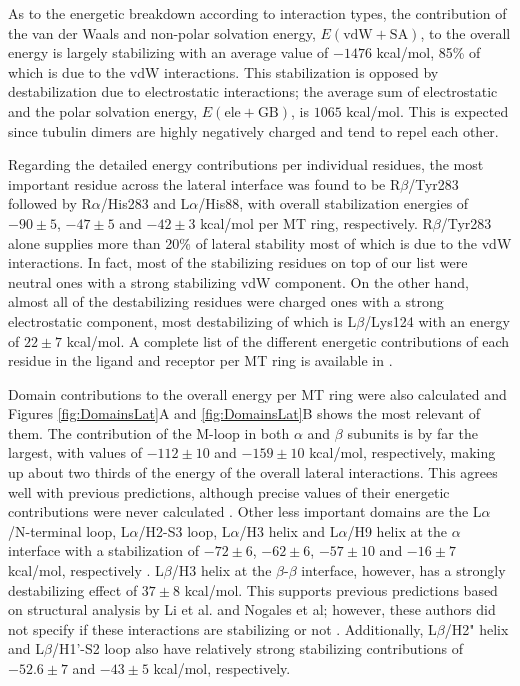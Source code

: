 \documentclass[11pt]{report}
\begin{document}
As to the energetic breakdown according to interaction types, the contribution of the van 
der Waals and non-polar solvation energy, $E(\text{vdW}+\text{SA})$, to the overall energy is largely stabilizing with an average value of $-1476$ kcal/mol, 85\% of which is 
due to the \gls{vdW} interactions.
This stabilization is opposed by destabilization 
due to electrostatic interactions; the average sum of electrostatic and the polar solvation
energy, $E(\text{ele}+\text{GB})$, is $1065$ kcal/mol. This is expected
since tubulin dimers are highly
negatively charged and tend to
repel each other.

Regarding the detailed energy contributions per individual residues, the most important
residue across the lateral interface was found to be R$\beta$/Tyr283
followed by R$\alpha$/His283 and L$\alpha$/His88,
with overall stabilization energies of $-90\pm5$, 
$-47\pm5$ and $-42\pm3$ kcal/mol per MT ring, respectively. R$\beta$/Tyr283 alone
supplies more than 20\% of lateral stability
most of which is due to the vdW interactions. In fact,
most of the stabilizing residues on top of our list
were neutral ones with a strong stabilizing vdW 
component. On the other hand, almost all of the 
destabilizing residues were charged ones
with a strong electrostatic component,
most destabilizing of which is L$\beta$/Lys124 
with an energy of $22\pm7$ kcal/mol. A complete list 
of the different energetic contributions of each 
residue in the ligand and receptor per MT ring is
available in \cite{Ayoub2015}.

Domain contributions to the overall energy per MT ring were also 
calculated and Figures \ref{fig:DomainsLat}A and \ref{fig:DomainsLat}B
shows the most relevant of them. The contribution of the M-loop in both $\alpha$ and
$\beta$ subunits is by far the largest, with
values of $-112\pm10$ and $-159\pm10$ kcal/mol, respectively,
making up about two thirds of the energy of the overall lateral interactions.
This agrees well with previous predictions, although precise
values of their energetic contributions were never
calculated \cite{Nogales1999,Snyder2001,Li2002}.
Other less important domains are the L$\alpha$/N-terminal loop, L$\alpha$/H2-S3
loop, L$\alpha$/H3 helix and L$\alpha$/H9 helix at the $\alpha$ interface
with a stabilization of $-72\pm6$, $-62\pm6$, $-57\pm10$
and $-16\pm7$ kcal/mol, respectively \cite{Nogales1999,Li2002}.
L$\beta$/H3 helix at the  $\beta$-$\beta$ interface, however, has a strongly
destabilizing effect of $37\pm8$ kcal/mol. This 
supports previous predictions based on
structural analysis by Li et al. and Nogales et al;
however, these authors did not specify if these interactions are stabilizing or not \cite{Nogales1999,Li2002}. 
Additionally, L$\beta$/H2" helix and L$\beta$/H1'-S2 loop also have relatively 
strong stabilizing contributions of $-52.6\pm7$
and $-43\pm5$ kcal/mol, respectively. 
\end{document}
